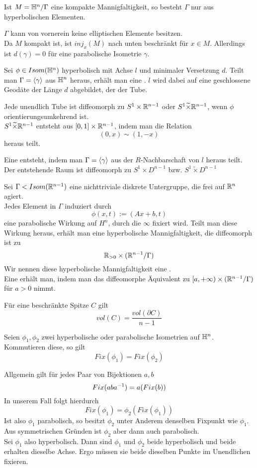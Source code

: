 \documentclass{book}
\begin{document}
\Kor{}
Ist $M = \mathbb{H}^n / \Gamma$ eine kompakte Mannigfaltigkeit, so besteht $\Gamma$ nur aus hyperbolischen Elementen.
\begin{Beweis}{}
	$\Gamma$ kann von vornerein keine elliptischen Elemente besitzen.\\
	Da $M$ kompakt ist, ist $inj_x(M)$ nach unten beschränkt für $x \in M$. Allerdings ist $d(\gamma) = 0$ für eine parabolische Isometrie $\gamma$.
\end{Beweis}

Sei $\phi \in Isom(\mathbb{H}^n)$ hyperbolisch mit Achse $l$ und minimaler Versetzung $d$. Teilt man $\Gamma = \left<\gamma\right>$ aus $\mathbb{H}^n$ heraus, erhält man eine . $l$ wird dabei auf eine geschlossene Geodäte der Länge $d$ abgebildet, der  der Tube.

\Prop{}
Jede unendlich Tube ist diffeomorph zu $S^1 \times \mathbb{R}^{n-1}$ oder $S^1 \widetilde{\times} \mathbb{R}^{n-1}$, wenn $\phi$ orientierungsumkehrend ist.\\
$S^1 \widetilde{\times} \mathbb{R}^{n-1}$ entsteht aus $[0,1] \times  \mathbb{R}^{n-1}$, indem man die Relation
\[ (0,x) \sim (1, -x) \]
heraus teilt.

\Def{}
Eine  entsteht, indem man $\Gamma = \left<\gamma\right>$ aus der $R$-Nachbarschaft von $l$ heraus teilt. Der entstehende Raum ist diffeomorph zu $S^1 \times D^{n-1}$ bzw. $S^1 \widetilde{\times} D^{n-1}$

Sei $\Gamma < Isom(\mathbb{R}^{n-1})$ eine nichttriviale diskrete Untergruppe, die frei auf $\mathbb{R}^n$ agiert.\\
Jedes Element in $\Gamma$ induziert durch
\[ \phi(x,t) := (Ax + b, t) \]
eine parabolische Wirkung auf $H^n$, durch die $\infty$ fixiert wird. Teilt man diese Wirkung heraus, erhält man eine hyperbolische Mannigfaltigkeit, die diffeomorph ist zu
\[ \mathbb{R}_{> 0} \times (\mathbb{R}^{n-1} / \Gamma) \]
Wir nennen diese hyperbolische Mannigfaltigkeit eine .\\
Eine  erhält man, indem man das diffeomorphe Äquivalent zu $[a,+\infty) \times (\mathbb{R}^{n-1} / \Gamma)$ für $a > 0$ nimmt.

\Prop{}
Für eine beschränkte Spitze $C$ gilt
\[ vol(C) = \frac{vol(\partial C)}{n-1} \]

\Lem{}
Seien $\phi_1,\phi_2$ zwei hyperbolische oder parabolische Isometrien auf $\mathbb{H}^n$. Kommutieren diese, so gilt
\[ Fix(\phi_1) = Fix(\phi_2) \]
\begin{Beweis}{}
	Allgemein gilt für jedes Paar von Bijektionen $a,b$
	\[ Fix(aba^{-1}) = a(Fix(b)) \]
	In unserem Fall folgt hierdurch
	\[ Fix(\phi_1) = \phi_2(Fix(\phi_1)) \]
	Ist also $\phi_1$ parabolisch, so besitzt $\phi_2$ unter Anderem denselben Fixpunkt wie $\phi_1$. Aus symmetrischen Gründen ist $\phi_2$ aber dann auch parabolisch.\\
	Sei $\phi_1$ also hyperbolisch. Dann sind $\phi_1$ und $\phi_2$ beide hyperbolisch und beide erhalten dieselbe Achse. Ergo müssen sie beide dieselben Punkte im Unendlichen fixieren.
\end{Beweis}
\end{document}
